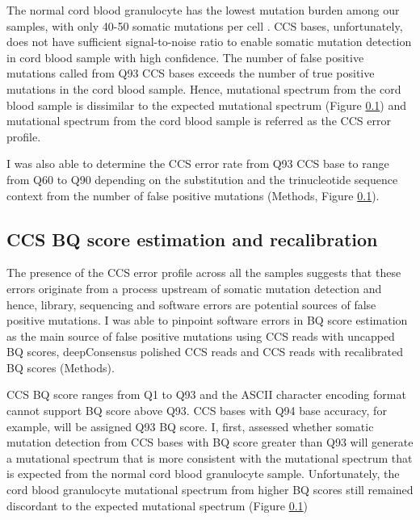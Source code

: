 The normal cord blood granulocyte has the lowest mutation burden among our samples, with only 40-50 somatic mutations per cell \cite{Mitchell2022-ry}. CCS bases, unfortunately, does not have sufficient signal-to-noise ratio to enable somatic mutation detection in cord blood sample with high confidence. The number of false positive mutations called from Q93 CCS bases exceeds the number of true positive mutations in the cord blood sample. Hence, mutational spectrum from the cord blood sample is dissimilar to the expected mutational spectrum (Figure \ref{}) and mutational spectrum from the cord blood sample is referred as the CCS error profile. 


I was also able to determine the CCS error rate from Q93 CCS base to range from Q60 to Q90 depending on the substitution and the trinucleotide sequence context from the number of false positive mutations (Methods, Figure \ref{}).



\subsection{CCS BQ score estimation and recalibration} 

The presence of the CCS error profile across all the samples suggests that these errors originate from a process upstream of somatic mutation detection and hence, library, sequencing and software errors are potential sources of false positive mutations. I was able to pinpoint software errors in BQ score estimation as the main source of false positive mutations using CCS reads with uncapped BQ scores, deepConsensus polished CCS reads and CCS reads with recalibrated BQ scores (Methods). 

CCS BQ score ranges from Q1 to Q93 and the ASCII character encoding format cannot support BQ score above Q93. CCS bases with Q94 base accuracy, for example, will be assigned Q93 BQ score. I, first, assessed whether somatic mutation detection from CCS bases with BQ score greater than Q93 will generate a mutational spectrum that is more consistent with the mutational spectrum that is expected from the normal cord blood granulocyte sample. Unfortunately, the cord blood granulocyte mutational spectrum from higher BQ scores still remained discordant to the expected mutational spectrum (Figure \ref{})

